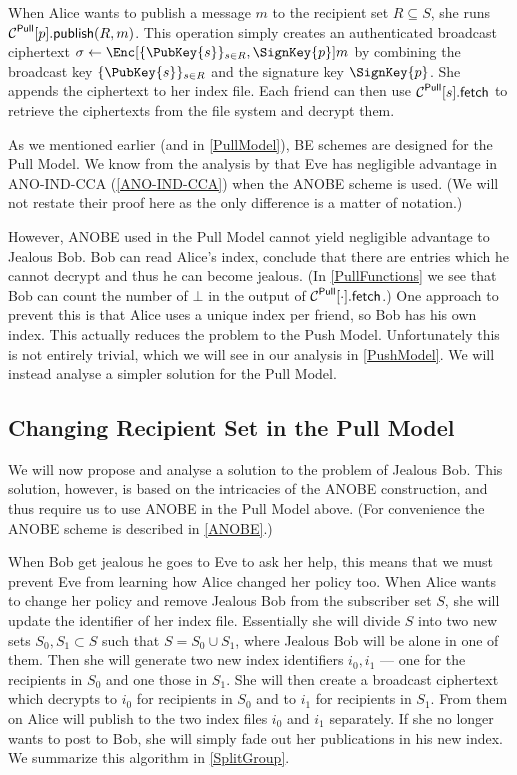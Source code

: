 When Alice wants to publish a message \(m\) to the recipient set \(R\subseteq 
  S\), she runs \(\ppub{p}[R][m]\).
This operation simply creates an authenticated broadcast ciphertext 
\(\sigma\gets \Enc[\{\PubKey{s}\}_{s\in R}, \SignKey{p}]{m}\) by combining the 
broadcast key \(\{\PubKey{s}\}_{s\in R}\) and the signature key 
\(\SignKey{p}\).
She appends the ciphertext to her index file.
Each friend can then use \(\pget{s}\) to retrieve the ciphertexts from the file 
system and decrypt them.

As we mentioned earlier (and in \cref{PullModel}), \ac{BE} schemes are designed 
for the Pull Model.
We know from the analysis by \citet{ANOBE} that Eve has negligible advantage in 
ANO-IND-CCA (\cref{ANO-IND-CCA}) when the \ac{ANOBE} scheme is used.
(We will not restate their proof here as the only difference is a matter of 
notation.)

However, \ac{ANOBE} used in the Pull Model cannot yield negligible advantage to
Jealous Bob.
Bob can read Alice's index, conclude that there are entries which he cannot 
decrypt and thus he can become jealous.
(In \cref{PullFunctions} we see that Bob can count the number of \(\bot\) in 
the output of \(\pget{\cdot}\).)
One approach to prevent this is that Alice uses a unique index per friend, so 
Bob has his own index.
This actually reduces the problem to the Push Model.
Unfortunately this is not entirely trivial, which we will see in our analysis 
in \cref{PushModel}.
We will instead analyse a simpler solution for the Pull Model.

\subsection{Changing Recipient Set in the Pull Model}
\label{ChangingPullRecipientSet}

We will now propose and analyse a solution to the problem of Jealous Bob.
This solution, however, is based on the intricacies of the \ac{ANOBE} 
construction, and thus require us to use \ac{ANOBE} in the Pull Model above.
(For convenience the \ac{ANOBE} scheme is described in \cref{ANOBE}.)

When Bob get jealous he goes to Eve to ask her help, this means that we must 
prevent Eve from learning how Alice changed her policy too.
When Alice wants to change her policy and remove Jealous Bob from the 
subscriber set \(S\), she will update the identifier of her index file.
Essentially she will divide \(S\) into two new sets \(S_0, S_1\subset S\) such 
that \(S = S_0\cup S_1\), where Jealous Bob will be alone in one of them.
Then she will generate two new index identifiers \(i_0, i_1\) --- one for the 
recipients in \(S_0\) and one those in \(S_1\).
She will then create a broadcast ciphertext which decrypts to \(i_0\) for 
recipients in \(S_0\) and to \(i_1\) for recipients in \(S_1\).
From them on Alice will publish to the two index files \(i_0\) and \(i_1\) 
separately.
If she no longer wants to post to Bob, she will simply fade out her 
publications in his new index.
We summarize this algorithm in \cref{SplitGroup}.

